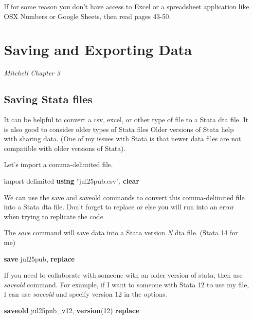 \documentclass[
]{book}
\newenvironment{Shaded}{\begin{snugshade}}{\end{snugshade}}
\newcommand{\KeywordTok}[1]{\textcolor[rgb]{0.13,0.29,0.53}{\textbf{#1}}}
\newcommand{\NormalTok}[1]{#1}
\newcommand{\StringTok}[1]{\textcolor[rgb]{0.31,0.60,0.02}{#1}}
\begin{document}
If for some reason you don't have access to Excel or a spreadsheet application
like OSX Numbers or Google Sheets, then read pages 43-50.

\chapter{Saving and Exporting Data}\label{saving-and-exporting-data}

\emph{Mitchell Chapter 3}

\section{Saving Stata files}\label{saving-stata-files}

It can be helpful to convert a csv, excel, or other type of file to a Stata dta file. It is also good to consider older types of Stata files Older versions of Stata help with sharing data. (One of my issues with Stata is that newer data files are not compatible with older versions of Stata).

Let's import a comma-delimited file.

\begin{Shaded}
\begin{Highlighting}[]
\NormalTok{import delimited }\KeywordTok{using} \StringTok{"jul25pub.csv"}\NormalTok{, }\KeywordTok{clear}
\end{Highlighting}
\end{Shaded}

We can use the save and saveold commands to convert this comma-delimited file into a Stata dta file. Don't forget to replace or else you will run into an error when trying to replicate the code.

The \emph{save} command will save data into a Stata version \emph{N} dta file. (Stata 14 for me)

\begin{Shaded}
\begin{Highlighting}[]
\KeywordTok{save}\NormalTok{ jul25pub, }\KeywordTok{replace}
\end{Highlighting}
\end{Shaded}

If you need to collaborate with someone with an older version of stata, then use \emph{saveold} command. For example, if I want to someone with Stata 12 to use my file, I can use \emph{saveold} and specify version 12 in the options.

\begin{Shaded}
\begin{Highlighting}[]
\KeywordTok{saveold}\NormalTok{ jul25pub\_v12, }\KeywordTok{version}\NormalTok{(12) }\KeywordTok{replace}
\end{Highlighting}
\end{Shaded}
\end{document}
